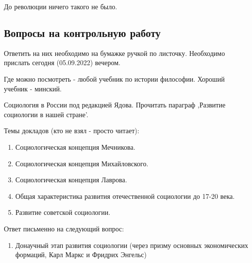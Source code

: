 \documentclass{article}
\begin{document}
До революции ничего такого не было.

\subsection{Вопросы на контрольную работу}

Ответить на них необходимо на бумажке ручкой по листочку. Необходимо прислать сегодня (05.09.2022) вечером.

Где можно посмотреть - любой учебник по истории философии. Хороший учебник - минский.

Социология в России под редакцией Ядова. Прочитать параграф ,Развитие социологии в нашей стране'.

Темы докладов (кто не взял - просто читает):

\begin{enumerate}
    \item Социологическая концепция Мечникова.
    \item Социологическая концепция Михайловского.
    \item Социологическая концепция Лаврова.
    \item Общая характеристика развития отечественной социологии до 17-20 века.
    \item Развитие советской социологии.
\end{enumerate}

Ответ письменно на следующий вопрос:

\begin{enumerate}
    \item Донаучный этап развития социологии (через призму основных экономических формаций, Карл Маркс и Фридрих Энгельс)
\end{enumerate}
\end{document}
